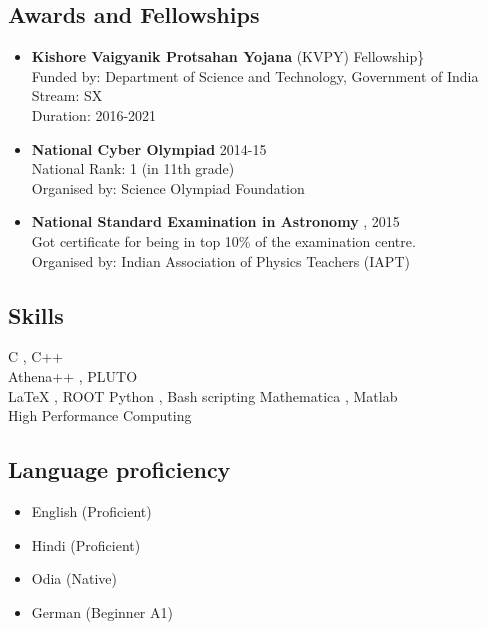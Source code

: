 \documentclass[
  a4paper,
  11pt,
  oneside]{article}
\providecommand{\tightlist}{%
  \setlength{\itemsep}{0pt}\setlength{\parskip}{0pt}}\usepackage{longtable,booktabs,array}
\begin{document}
\hypertarget{awards-and-fellowships}{%
\subsection{Awards and Fellowships}\label{awards-and-fellowships}}

\begin{itemize}
\item
  \textbf{Kishore Vaigyanik Protsahan Yojana} (KVPY) Fellowship\}\\
  Funded by: Department of Science and Technology, Government of India\\
  Stream: SX\\
  Duration: 2016-2021
\item
  \textbf{National Cyber Olympiad} 2014-15\\
  National Rank: 1 (in 11th grade)\\
  Organised by: Science Olympiad Foundation
\item
  \textbf{National Standard Examination in Astronomy} , 2015\\
  Got certificate for being in top 10\% of the examination centre.\\
  Organised by: Indian Association of Physics Teachers (IAPT)
\end{itemize}

\hypertarget{skills}{%
\subsection{Skills}\label{skills}}

C , C++\\
Athena++ , PLUTO\\
LaTeX , ROOT Python , Bash scripting Mathematica , Matlab\\
High Performance Computing

\hypertarget{language-proficiency}{%
\subsection{Language proficiency}\label{language-proficiency}}

\begin{itemize}
\tightlist
\item
  English (Proficient)
\item
  Hindi (Proficient)
\item
  Odia (Native)
\item
  German (Beginner A1)
\end{itemize}
\end{document}
